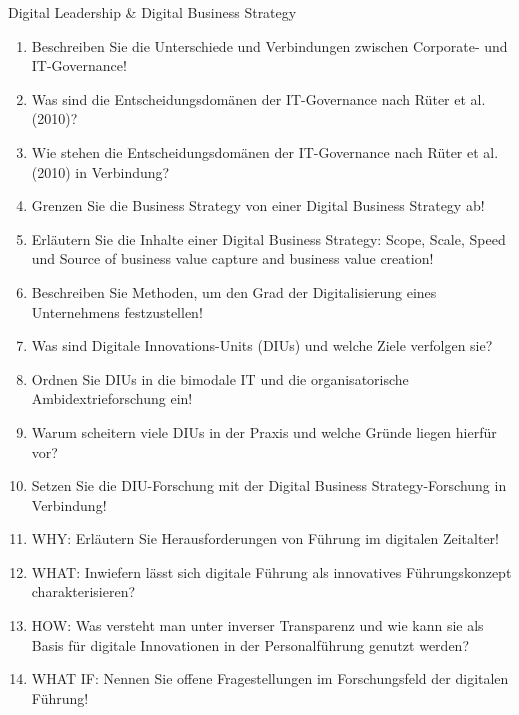 \documentclass{article}
\begin{document}
\begin{exercise}{Digital Leadership \& Digital Business Strategy}
  \begin{enumerate}
    \item Beschreiben Sie die Unterschiede und Verbindungen zwischen Corporate- und IT-Governance!
    \item Was sind die Entscheidungsdomänen der IT-Governance nach Rüter et al. (2010)?
    \item Wie stehen die Entscheidungsdomänen der IT-Governance nach Rüter et al. (2010) in Verbindung?
    \item Grenzen Sie die Business Strategy von einer Digital Business Strategy ab!
    \item Erläutern Sie die Inhalte einer Digital Business Strategy: Scope, Scale, Speed und Source of business value capture and business value creation!
    \item Beschreiben Sie Methoden, um den Grad der Digitalisierung eines Unternehmens festzustellen!
    \item Was sind Digitale Innovations-Units (DIUs) und welche Ziele verfolgen sie?
    \item Ordnen Sie DIUs in die bimodale IT und die organisatorische Ambidextrieforschung ein!
    \item Warum scheitern viele DIUs in der Praxis und welche Gründe liegen hierfür vor?
    \item Setzen Sie die DIU-Forschung mit der Digital Business Strategy-Forschung in Verbindung!
    \item WHY: Erläutern Sie Herausforderungen von Führung im digitalen Zeitalter!
    \item WHAT: Inwiefern lässt sich digitale Führung als innovatives Führungskonzept charakterisieren?
    \item HOW: Was versteht man unter inverser Transparenz und wie kann sie als Basis für digitale Innovationen in der Personalführung genutzt werden?
    \item WHAT IF: Nennen Sie offene Fragestellungen im Forschungsfeld der digitalen Führung!
  \end{enumerate}


\end{exercise}
\end{document}
